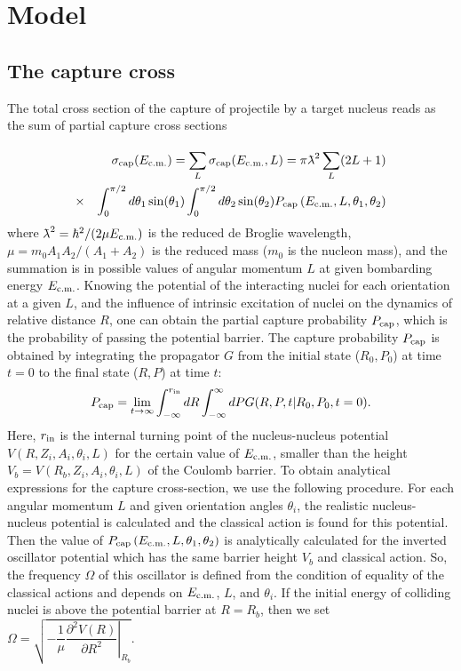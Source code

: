 \documentclass[preprint,review,12pt]{elsarticle}
\newcommand{\lambdabar}{{\mkern0.75mu\mathchar '26\mkern -9.75mu\lambda}}
\begin{document}
\section{Model}
\subsection{The capture cross}
\label{1}
 The total cross section of the
  capture of projectile by a target nucleus reads as the sum of partial capture cross sections


  \begin{eqnarray}
  &&\sigma_{\rm cap}(E_{\rm c.m.})=\sum_{L}^{}\sigma_{\rm cap}(E_{\rm c.m.},L)=\pi\lambdabar^2 \sum_{L}(2L+1)  \nonumber\\
   &\times&  \int_0^{\pi/2}d\theta_1\sin(\theta_1)\int_0^{\pi/2}d\theta_2\sin(\theta_2)P_{\rm cap}\left(E_{\rm c.m.},L,\theta_1,\theta_2\right)
  \label{1a_eq}
  \end{eqnarray}
where $\lambdabar^2=\hbar^2/(2\mu E_{\rm c.m.})$ is the reduced de Broglie wavelength,
  $\mu=m_0 A_1 A_2/(A_1+A_2)$ is the reduced mass ($m_0$ is the nucleon mass), and the summation is in possible values of angular momentum $L$
  at given bombarding energy $E_{\rm c.m.}$.
  Knowing the potential of the interacting nuclei for each orientation at a given $L$, and the influence of intrinsic excitation of nuclei on the dynamics of
  relative distance $R$,  one can obtain the partial capture probability $P_{\rm cap}$, which is the probability of
  passing the potential barrier.
The capture probability $P_{\rm cap}$ is obtained by integrating the
  propagator $G$ from the initial state ($R_0, P_0$) at time $t = 0$ to
  the final state ($R,P$) at time $t$:
  \begin{eqnarray}
  P_{\rm cap}=\lim_{t\to\infty}\int_{-\infty}^{r_{\rm in}}dR\int_{-\infty}^{\infty}dP G(R,P,t|R_0,P_0,t=0).
  \label{PcapG}
  \end{eqnarray}
  Here, $r_{\rm in}$ is the internal turning point of the nucleus-nucleus potential\break
  $V(R,Z_i, A_i,\theta_i,L)$ for the certain value of $E_{\rm c.m.}$, smaller than the height\break $V_b=V(R_b,Z_i, A_i,\theta_i,L)$
  of the Coulomb barrier. To obtain analytical expressions for the capture cross-section, we
  use the following procedure. For each angular momentum $L$ and given orientation angles $\theta_i$, the realistic nucleus-nucleus potential is calculated and the classical action is found for this potential.
  Then the value of $P_{\rm cap}\left(E_{\rm c.m.},L,\theta_1,\theta_2\right)$ is analytically
  calculated for the inverted oscillator potential which has the same barrier height $V_b$ and
  classical action. So, the frequency $\Omega$ of this oscillator is defined from the condition of equality of the
  classical actions and depends on $E_{\rm c.m.}$, $L$, and $\theta_i$.
  If the initial energy of colliding nuclei is above the potential barrier at $R=R_b$, then we set
  $\Omega=\sqrt{\left.-\dfrac{1}{\mu}\dfrac{\partial^2 V(R)}{\partial R^2}\right|_{R_b}}$.
\end{document}
